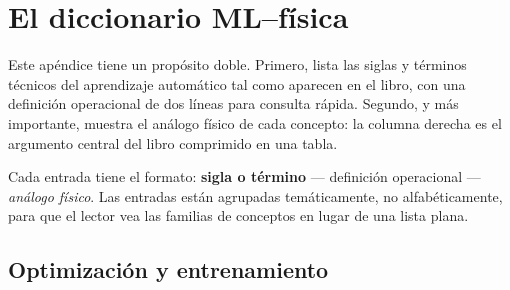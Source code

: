 \chapter{El diccionario ML--física}
\label{ap:glosario}

Este apéndice tiene un propósito doble. Primero, lista las siglas y términos
técnicos del aprendizaje automático tal como aparecen en el libro, con una
definición operacional de dos líneas para consulta rápida. Segundo, y más
importante, muestra el análogo físico de cada concepto: la columna derecha
es el argumento central del libro comprimido en una tabla.

Cada entrada tiene el formato: \textbf{sigla o término} --- definición
operacional --- \emph{análogo físico}. Las entradas están agrupadas
temáticamente, no alfabéticamente, para que el lector vea las familias de
conceptos en lugar de una lista plana.

\section*{Optimización y entrenamiento}

